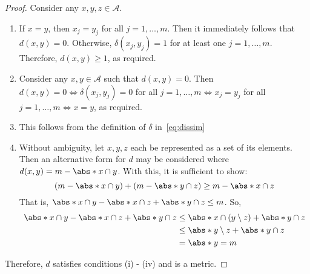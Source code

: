 \begin{proof}
    Consider any \(x,y,z \in \mathcal A\).
    \begin{enumerate}[label=(\roman*)]
        \item If \(x = y\), then \(x_j = y_j\) for all \(j = 1, \ldots, m\).
            Then it immediately follows that \(d(x,y) = 0\). Otherwise,
            \(\delta\left(x_j, y_j\right) = 1\) for at least one
            \(j = 1, \ldots, m\). Therefore, \(d(x, y) \geq 1\), as required.
        \item Consider any \(x, y \in \mathcal A\) such that \(d(x, y) = 0\).
            Then \(d(x, y) = 0 \iff \delta\left(x_j, y_j\right) = 0\) for all
            \(j = 1, \ldots, m \iff x_j = y_j\) for all
            \(j = 1, \ldots, m \iff x = y\), as required.
        \item This follows from the definition
            of \(\delta\) in~\eqref{eq:dissim}
        \item Without ambiguity, let \(x, y, z\) each be represented as a set of
            its elements. Then an alternative form for \(d\) may be considered
            where \(d(x, y) = m - \abs*{x \cap y}\). With this, it is sufficient
            to show:
            \[
                \left(m - \abs*{x \cap y}\right)
                + \left(m - \abs*{y \cap z}\right)
                \geq m - \abs*{x \cap z}
            \]
            That is,
            \(\abs*{x \cap y} - \abs*{x \cap z} + \abs*{y \cap z} \leq m\). So,
            \[
                \begin{aligned}
                    \abs*{x \cap y} - \abs*{x \cap z} + \abs*{y \cap z}
                    & \leq
                    \abs*{x \cap \left(y \setminus z\right)} + \abs*{y \cap z}\\
                    & \leq
                    \abs*{y \setminus z} + \abs*{y \cap z}\\
                    & = \abs*{y} = m
                \end{aligned}
            \]
    \end{enumerate}

    Therefore, \(d\) satisfies conditions (i) \-- (iv) and is a metric.
\end{proof}
